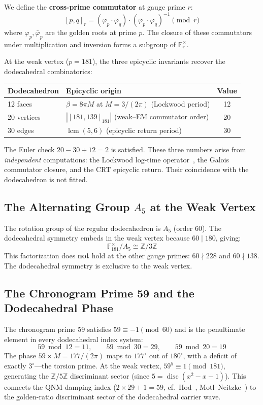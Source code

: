 We define the \textbf{cross-prime commutator} at gauge prime $r$:
$$ [p,q]_r = (\varphi_p \cdot \bar{\varphi}_q) \cdot (\bar{\varphi}_p \cdot \varphi_q)^{-1} \pmod{r} $$
where $\varphi_p, \bar{\varphi}_p$ are the golden roots at prime $p$. The closure of these commutators under multiplication and inversion forms a subgroup of $\mathbb{F}_r^{\times}$.

At the weak vertex ($p = 181$), the three epicyclic invariants recover the dodecahedral combinatorics:

\begin{center}
\begin{tabular}{llc}
\hline
Dodecahedron & Epicyclic origin & Value \\
\hline
12 faces & $\beta = 8\pi M$ at $M = 3/(2\pi)$ (Lockwood period) & 12 \\
20 vertices & $|[181,139]_{181}|$ (weak--EM commutator order) & 20 \\
30 edges & $\operatorname{lcm}(5, 6)$ (epicyclic return period) & 30 \\
\hline
\end{tabular}
\end{center}

The Euler check $20 - 30 + 12 = 2$ is satisfied. These three numbers arise from \textit{independent} computations: the Lockwood log-time operator~\cite{lockwood_v11}, the Galois commutator closure, and the CRT epicyclic return. Their coincidence with the dodecahedron is not fitted.

\subsection{The Alternating Group $A_5$ at the Weak Vertex}

The rotation group of the regular dodecahedron is $A_5$ (order 60). The dodecahedral symmetry embeds in the weak vertex because $60 \mid 180$, giving:
$$ \mathbb{F}_{181}^{\times} / A_5 \cong \mathbb{Z}/3\mathbb{Z} $$
This factorization does \textbf{not} hold at the other gauge primes: $60 \nmid 228$ and $60 \nmid 138$. The dodecahedral symmetry is exclusive to the weak vertex.

\subsection{The Chronogram Prime 59 and the Dodecahedral Phase}

The chronogram prime 59 satisfies $59 \equiv -1 \pmod{60}$ and is the penultimate element in every dodecahedral index system:
$$ 59 \bmod 12 = 11, \qquad 59 \bmod 30 = 29, \qquad 59 \bmod 20 = 19 $$
The phase $59 \times M = 177/(2\pi)$ maps to $177^{\circ}$ out of $180^{\circ}$, with a deficit of exactly $3^{\circ}$---the torsion prime. At the weak vertex, $59^5 \equiv 1 \pmod{181}$, generating the $\mathbb{Z}/5\mathbb{Z}$ discriminant sector (since $5 = \operatorname{disc}(x^2 - x - 1)$). This connects the QNM damping index ($2 \times 29 + 1 = 59$, cf.\ Hod~\cite{hod1998}, Motl--Neitzke~\cite{motl2003}) to the golden-ratio discriminant sector of the dodecahedral carrier wave.


